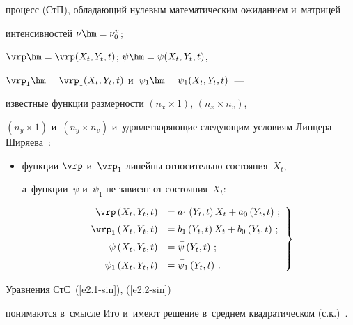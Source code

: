 процесс (СтП), обладающий нулевым математическим ожиданием и~матрицей 


интенсивностей $\nu\hm=\nu_0^v$;


$\vrp\hm=\vrp (X_t, Y_t, t)$; $\psi\hm=\psi (X_t, Y_t, t)$, 


$\vrp_1\hm=\vrp_1 (X_t, Y_t, t)$ и~$\psi_1\hm=\psi_1 (X_t, Y_t, t)$~--- 


известные функции размерности $(n_x\times 1)$, $(n_x\times n_v)$, 


$(n_y \times 1)$ и~$(n_y\times n_v)$ и~удовле\-тво\-ря\-ющие следующим условиям Лип\-це\-ра--Ши\-ря\-ева~\cite{2-sin}:


\begin{itemize}


\item функции $\vrp$ и~$\vrp_1$ линейны относительно состояния~$X_t$, 


а~функции~$\psi$ и~$\psi_1$  не зависят от состояния~$X_t$:


\begin{equation}


\left.


\begin{array}{rl}


\vrp \left(X_t, Y_t, t\right) &= a_1 \left(Y_t, t\right) X_t + a_0 \left(Y_t, t\right)\,;\\[6pt] 


\vrp_1 \left(X_t, Y_t, t\right) &= b_1 \left(Y_t, t\right) X_t + b_0 \left(Y_t, t\right)\,;\\[6pt]


\psi \left(X_t, Y_t, t\right)& = \bar\psi \left(Y_t, t\right)\,;\\[6pt]


\psi_1 \left(X_t, Y_t, t\right) &= \bar\psi_1 \left(Y_t, t\right)\,.


\end{array}


\right\}


\label{e2.2-sin}


\end{equation}


\end{itemize}





Уравнения СтС~(\ref{e2.1-sin}), (\ref{e2.2-sin}) 


понимаются в~смысле Ито и~имеют решение в~среднем квадратическом (с.к.)~\cite{2-sin}.






